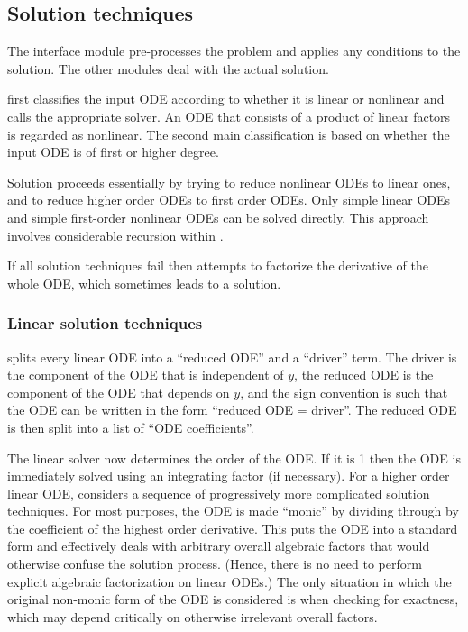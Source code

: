 \subsection{Solution techniques}

The  interface module pre-processes the problem and applies
any conditions to the solution.  The other modules deal with the
actual solution.

 first classifies the input ODE according to whether it
is linear or nonlinear and calls the appropriate solver.  An ODE that
consists of a product of linear factors is regarded as nonlinear.  The
second main classification is based on whether the input ODE is of
first or higher degree.

Solution proceeds essentially by trying to reduce nonlinear ODEs to
linear ones, and to reduce higher order ODEs to first order ODEs.
Only simple linear ODEs and simple first-order nonlinear ODEs can be
solved directly.  This approach involves considerable recursion within
.

If all solution techniques fail then  attempts to
factorize the derivative of the whole ODE, which sometimes leads to a
solution.


\subsubsection{Linear solution techniques}

 splits every linear ODE into a ``reduced ODE'' and a
``driver'' term.  The driver is the component of the ODE that is
independent of $y$, the reduced ODE is the component of the ODE that
depends on $y$, and the sign convention is such that the ODE can be
written in the form ``reduced ODE = driver''.  The reduced ODE is then
split into a list of ``ODE coefficients''.

The linear solver now determines the order of the ODE\@.  If it is 1
then the ODE is immediately solved using an integrating factor (if
necessary).  For a higher order linear ODE,  considers a
sequence of progressively more complicated solution techniques.  For
most purposes, the ODE is made ``monic'' by dividing through by the
coefficient of the highest order derivative.  This puts the ODE into a
standard form and effectively deals with arbitrary overall algebraic
factors that would otherwise confuse the solution process.  (Hence,
there is no need to perform explicit algebraic factorization on linear
ODEs.)  The only situation in which the original non-monic form of the
ODE is considered is when checking for exactness, which may depend
critically on otherwise irrelevant overall factors.

